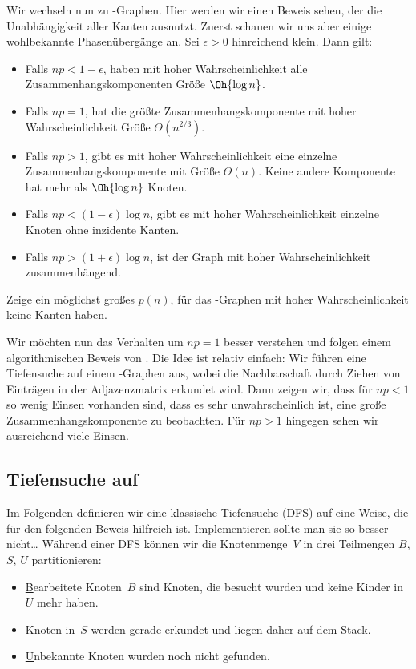 Wir wechseln nun zu \Gnp-Graphen.
Hier werden wir einen Beweis sehen, der die Unabhängigkeit aller Kanten ausnutzt.
Zuerst schauen wir uns aber einige wohlbekannte Phasenübergänge an.
Sei $\epsilon >0$ hinreichend klein.
Dann gilt:
\begin{itemize}
    \item Falls $np < 1 - \epsilon$, haben mit hoher Wahrscheinlichkeit alle Zusammenhangskomponenten Größe $\Oh{\log n}$.
    \item Falls $np = 1$, hat die größte Zusammenhangskomponente mit hoher Wahrscheinlichkeit Größe $\Theta(n^{2/3})$.
    \item Falls $np > 1$, gibt es mit hoher Wahrscheinlichkeit eine einzelne Zusammenhangskomponente mit Größe $\Theta(n)$.
          Keine andere Komponente hat mehr als $\Oh{\log n}$ Knoten.

    \item Falls $np < (1-\epsilon)\log n$, gibt es mit hoher Wahrscheinlichkeit einzelne Knoten ohne inzidente Kanten.
    \item Falls $np > (1+\epsilon)\log n$, ist der Graph mit hoher Wahrscheinlichkeit zusammenhängend.
\end{itemize}

\begin{exercise}
    Zeige ein möglichst großes $p(n)$, für das \Gnp-Graphen mit hoher Wahrscheinlichkeit keine Kanten haben.
\end{exercise}

Wir möchten nun das Verhalten um $np = 1$ besser verstehen und folgen einem algorithmischen Beweis von \cite{DBLP:journals/rsa/KrivelevichS13}.
Die Idee ist relativ einfach:
Wir führen eine Tiefensuche auf einem \Gnp-Graphen aus, wobei die Nachbarschaft durch Ziehen von Einträgen in der Adjazenzmatrix erkundet wird.
Dann zeigen wir, dass für $np < 1$ so wenig Einsen vorhanden sind, dass es sehr unwahrscheinlich ist, eine große Zusammenhangskomponente zu beobachten.
Für $np > 1$ hingegen sehen wir ausreichend viele Einsen.

\subsection{Tiefensuche auf \Gnp}
Im Folgenden definieren wir eine klassische Tiefensuche (DFS) auf eine Weise, die für den folgenden Beweis hilfreich ist.
Implementieren sollte man sie so besser nicht\dots
Während einer DFS können wir die Knotenmenge~$V$ in drei Teilmengen $B$, $S$, $U$ partitionieren:
\begin{itemize}
    \item \underline Bearbeitete Knoten~$B$ sind Knoten, die besucht wurden und keine Kinder in $U$ mehr haben.
    \item Knoten in~$S$ werden gerade erkundet und liegen daher auf dem \underline Stack.
    \item \underline Unbekannte Knoten wurden noch nicht gefunden.
\end{itemize}

